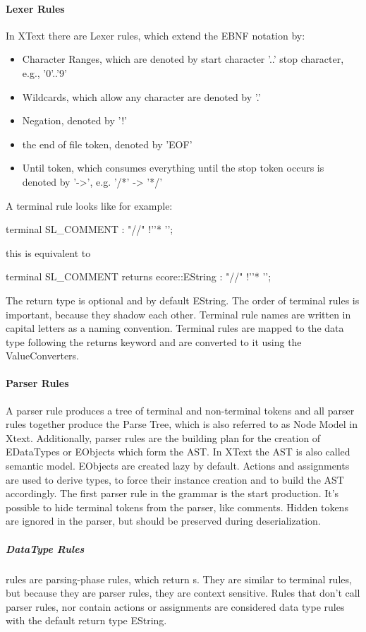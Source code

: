 \paragraph{Lexer Rules}
In XText there are Lexer rules, which extend the EBNF notation by:
\begin{itemize}
	\item Character Ranges, which are denoted by start character '..' stop character, e.g., '0'..'9' 
	\item Wildcards, which allow any character are denoted by '.'
	\item Negation, denoted by '!'
	\item the end of file token, denoted by 'EOF'
	\item Until token, which consumes everything until the stop token occurs is denoted by '->', e.g. '/*' -> '*/'
\end{itemize}
A terminal rule looks like for example:
\begin{xtxt}
terminal SL_COMMENT : "//" !'\n'* '\n';
\end{xtxt}
this is equivalent to 
\begin{xtxt}
terminal SL_COMMENT returns ecore::EString : "//" !'\n'* '\n';
\end{xtxt}
The return type is optional and by default EString. The order of terminal rules is important, because they shadow each other. Terminal rule names are written in capital letters as a naming convention. Terminal rules are mapped to the data type following the returns keyword and are converted to it using the ValueConverters.

\paragraph{Parser Rules}
A parser rule produces a tree of terminal and non-terminal tokens and all parser rules together produce the Parse Tree, which is also referred to as Node Model in Xtext. Additionally, parser rules are the building plan for the creation of EDataTypes or EObjects which form the AST. In XText the AST is also called semantic model. EObjects are created lazy by default. Actions and assignments are used to derive types, to force their instance creation and to build the AST accordingly. The first parser rule in the grammar is the start production. It's possible to hide terminal tokens from the parser, like comments. Hidden tokens are ignored in the parser, but should be preserved during deserialization.

\subparagraph{DataType Rules}
 rules are parsing-phase rules, which return s. They are similar to terminal rules, but because they are parser rules, they are context sensitive. Rules that don't call parser rules, nor contain actions or assignments are considered data type rules with the default return type EString. 
\begin{xtxt}
Number returns ecore::EInt : NUM ('.' NUM*)?;}
\end{xtxt}

